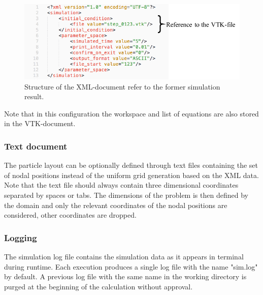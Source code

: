 \documentclass[a4paper,12pt,openany]{book}
\theoremstyle{break}
\begin{document}
\begin{figure}[h!]
  \includegraphics[scale=1]{xml_intro_simple.pdf}
  \centering
  \caption{Structure of the XML-document refer to the former simulation result.}
  \label{fig:xml_intro_simple}
\end{figure}\vspace*{3pt}
Note that in this configuration the workspace and list of equations are also stored in the VTK-document.
\subsubsection{Text document}
The particle layout can be optionally defined through text files containing the set of nodal positions instead of the uniform grid generation based on the XML data. Note that the text file should always contain three dimensional coordinates separated by spaces or tabs. The dimensions of the problem is then defined by the domain and only the relevant coordinates of the nodal positions are considered, other coordinates are dropped.
\subsubsection{Logging}
The simulation log file contains the simulation data as it appears in terminal during runtime. Each execution produces a single log file with the name "sim.log" by default. A previous log file with the same name in the working directory is purged at the beginning of the calculation without approval.
\end{document}
